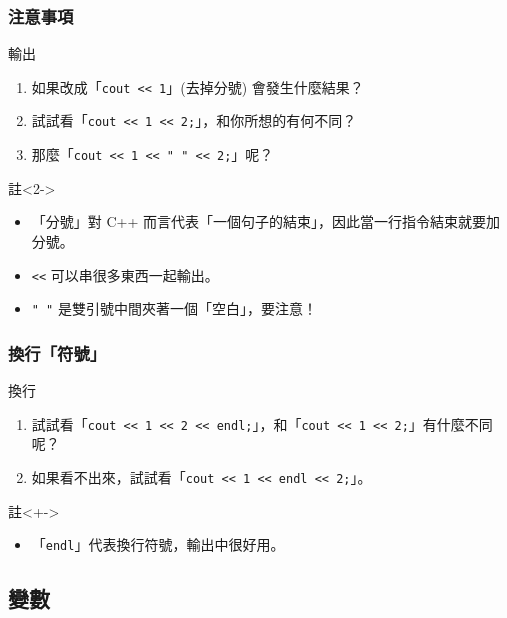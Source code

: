 \documentclass[utf8]{beamer}
\begin{document}
\begin{CJK}{UTF8}{bkai}
\begin{frame}[fragile]
  \frametitle{注意事項}
  \begin{block}{輸出}
    \begin{enumerate}
    \item<1-> 如果改成「\lstinline{cout << 1}」(去掉分號) 會發生什麼結果？
    \item<3-> 試試看「\lstinline{cout << 1 << 2;}」，和你所想的有何不同？
    \item<5-> 那麼「\lstinline{cout << 1 << " " << 2;}」呢？
    \end{enumerate}
  \end{block}
  \begin{exampleblock}{註}<2->
    \begin{itemize}
    \item<2-> 「分號」對 C++ 而言代表「\alert{一個句子的結束}」，因此當一行\alert{指令結束就要加分號}。
    \item<4-> \lstinline{<<} 可以串很多東西一起輸出。
    \item<5-> \lstinline{" "} 是雙引號中間夾著一個「空白」，\alert{要注意}！
    \end{itemize}
  \end{exampleblock}
\end{frame}

\begin{frame}[fragile]
  \frametitle{換行「符號」}
  \begin{block}{換行}
    \begin{enumerate}[<+->]
    \item 試試看「\lstinline{cout << 1 << 2 << endl;}」，和「\lstinline{cout << 1 << 2;}」有什麼不同呢？
    \item 如果看不出來，試試看「\lstinline{cout << 1 << endl << 2;}」。
    \end{enumerate}
  \end{block}
  \begin{exampleblock}{註}<+->
    \begin{itemize}
    \item 「\lstinline{endl}」代表\alert{換行}符號，輸出中很好用。
    \end{itemize}
  \end{exampleblock}
\end{frame}

\subsection{變數}


\end{CJK}
\end{document}
